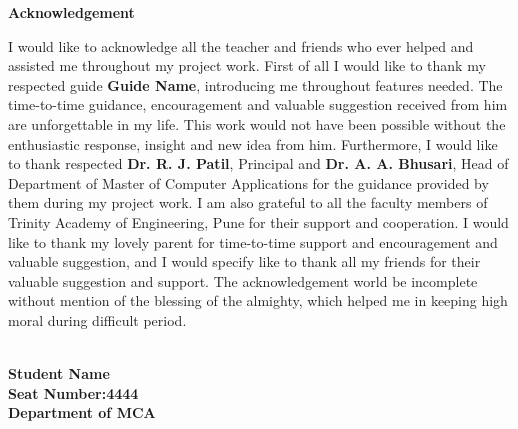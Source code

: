 \begin{center}
\thispagestyle{plain}
\LARGE{\textbf{Acknowledgement}}\\[1cm]
\end{center}
\linespread{1.13}
\large{
\noindent
I would like to acknowledge all the teacher and friends who ever helped and assisted me throughout my project work.\newline \newline
First of all I would like to thank my respected guide \textbf {Guide Name}, introducing me throughout features needed. The time-to-time guidance, encouragement and valuable suggestion received from him are unforgettable in my life. This work would not have been possible without the enthusiastic response, insight and new idea from him.\newline \newline
Furthermore, I would like to thank respected \textbf{Dr. R. J. Patil}, Principal and  \textbf{Dr. A. A. Bhusari}, Head of Department of Master of Computer Applications for the guidance provided by them during my project work. I am also grateful to all the faculty members of Trinity Academy of Engineering, Pune for their support and cooperation. I would like to thank my lovely parent for time-to-time support and encouragement and valuable suggestion, and I would specify like to thank all my friends for their valuable suggestion and support. The acknowledgement world be incomplete without mention of the blessing of the almighty, which helped me in keeping high moral during difficult period.
}
\large{

\begin{flushright}
{
\textbf {\vspace{2.1cm}\\Student Name}
\textbf {\vspace{.1cm}\\Seat Number:4444}
\textbf {\vspace{.1cm}\\Department of MCA}
}
\end{flushright}
\par
}
